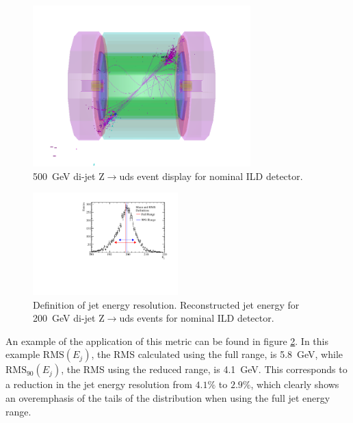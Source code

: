 \begin{figure}[h!]
\centering
\includegraphics[width=0.75\textwidth]{OptimisationStudies/Plots/MethodDescription/500GeVEvent.png}
\caption[500~GeV di-jet Z$\rightarrow$uds event display for nominal ILD detector.]{500~GeV di-jet Z$\rightarrow$uds event display for nominal ILD detector.}
\label{fig:500GeVzudsevtdisplay}
\end{figure} 

\begin{figure}[h!]
\centering
\includegraphics[width=0.5\textwidth]{OptimisationStudies/Plots/MethodDescription/RMS90Plot.pdf}
\caption[Definition of jet energy resolution.   Reconstructed jet energy for 200~GeV di-jet Z$\rightarrow$uds events for nominal ILD detector.]{Definition of jet energy resolution.   Reconstructed jet energy for 200~GeV di-jet Z$\rightarrow$uds events for nominal ILD detector.}
\label{fig:rms90defintion}
\end{figure} 

An example of the application of this metric can be found in figure \ref{fig:rms90defintion}.  In this example $\text{RMS}(E_{j})$, the RMS calculated using the full range, is 5.8~GeV, while $\text{RMS}_{90}(E_{j})$, the RMS using the reduced range, is 4.1~GeV.  This corresponds to a reduction in the jet energy resolution from $4.1\%$ to $2.9\%$, which clearly shows an overemphasis of the tails of the distribution when using the full jet energy range.

